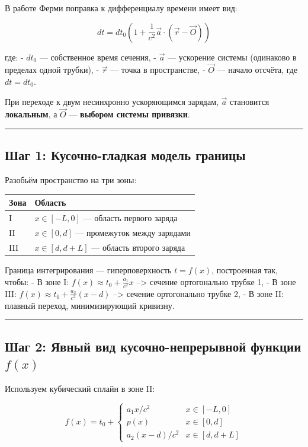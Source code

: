 \documentclass[11pt]{article}
\begin{document}
В работе Ферми поправка к дифференциалу времени имеет вид:

\[
dt = dt_0 \left( 1 + \frac{1}{c^2} \vec{a} \cdot (\vec{r} - \vec{O}) \right)
\]

где: - \(dt_0\) --- собственное время сечения, - \(\vec{a}\) ---
ускорение системы (одинаково в пределах одной трубки), - \(\vec{r}\) ---
точка в пространстве, - \(\vec{O}\) --- начало отсчёта, где
\(dt = dt_0\).

 При переходе к двум несинхронно ускоряющимся зарядам, \(\vec{a}\)
становится \textbf{локальным}, а \(\vec{O}\) --- \textbf{выбором системы
привязки}.

\begin{center}\rule{0.5\linewidth}{\linethickness}\end{center}

\subsection{ Шаг 1: Кусочно-гладкая модель границы}

Разобьём пространство на три зоны:

\begin{longtable}[]{@{}ll@{}}
\toprule
Зона & Область\tabularnewline
\midrule
\endhead
I & \(x \in [-L, 0]\) --- область первого заряда\tabularnewline
II & \(x \in [0, d]\) --- промежуток между зарядами\tabularnewline
III & \(x \in [d, d+L]\) --- область второго заряда\tabularnewline
\bottomrule
\end{longtable}

Граница интегрирования --- гиперповерхность \(t = f(x)\), построенная
так, чтобы: - В зоне I: \(f(x) \approx t_0 + \frac{a_1}{c^2} x\) -->
сечение ортогонально трубке 1, - В зоне III:
\(f(x) \approx t_0 + \frac{a_2}{c^2} (x - d)\) --> сечение ортогонально
трубке 2, - В зоне II: плавный переход, минимизирующий кривизну.

\begin{center}\rule{0.5\linewidth}{\linethickness}\end{center}

\subsection{\texorpdfstring{ Шаг 2: Явный вид кусочно-непрерывной функции
\(f(x)\)}{Шаг 2: Явный вид кусочно-непрерывной функции f(x)}}

Используем кубический сплайн в зоне II:

\[
f(x) = t_0 +
\begin{cases}
a_1 x / c^2 & x \in [-L, 0] \\
p(x) & x \in [0, d] \\
a_2 (x - d) / c^2 & x \in [d, d+L]
\end{cases}
\]
\end{document}

